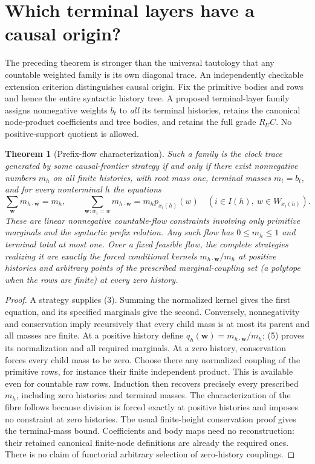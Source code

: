 \documentclass[11pt]{article}
\newtheorem{theorem}{Theorem}\newtheorem{proposition}[theorem]{Proposition}
\begin{document}
\section{Which terminal layers have a causal origin?}
The preceding theorem is stronger than the universal tautology that any countable weighted family is its own diagonal trace. An independently checkable extension criterion distinguishes causal origin. Fix the primitive bodies and rows and hence the entire syntactic history tree. A proposed terminal-layer family assigns nonnegative weights $b_t$ to \emph{all} its terminal histories, retains the canonical node-product coefficients and tree bodies, and retains the full grade $R_UC$. No positive-support quotient is allowed.

\begin{theorem}[Prefix-flow characterization]
Such a family is the clock trace generated by some causal-frontier strategy if and only if there exist nonnegative numbers $m_h$ on all finite histories, with root mass one, terminal masses $m_t=b_t$, and for every nonterminal $h$ the equations
\[
 \sum_{\mathbf w}m_{h\cdot\mathbf w}=m_h,\qquad
 \sum_{\mathbf w:w_i=w}m_{h\cdot\mathbf w}=m_h p_{x_i(h)}(w)
 \quad(i\in I(h),\ w\in W_{x_i(h)}).                     \tag{5}
\]
These are linear nonnegative countable-flow constraints involving only primitive marginals and the syntactic prefix relation. Any such flow has $0\leq m_h\leq1$ and terminal total at most one. Over a fixed feasible flow, the complete strategies realizing it are exactly the forced conditional kernels $m_{h\cdot\mathbf w}/m_h$ at positive histories and arbitrary points of the prescribed marginal-coupling set (a polytope when the rows are finite) at every zero history.
\end{theorem}
\begin{proof}
A strategy supplies (3). Summing the normalized kernel gives the first equation, and its specified marginals give the second. Conversely, nonnegativity and conservation imply recursively that every child mass is at most its parent and all masses are finite. At a positive history define $q_h(\mathbf w)=m_{h\cdot\mathbf w}/m_h$; (5) proves its normalization and all required marginals. At a zero history, conservation forces every child mass to be zero. Choose there any normalized coupling of the primitive rows, for instance their finite independent product. This is available even for countable raw rows. Induction then recovers precisely every prescribed $m_h$, including zero histories and terminal masses. The characterization of the fibre follows because division is forced exactly at positive histories and imposes no constraint at zero histories. The usual finite-height conservation proof gives the terminal-mass bound. Coefficients and body maps need no reconstruction: their retained canonical finite-node definitions are already the required ones. There is no claim of functorial arbitrary selection of zero-history couplings.
\end{proof}
\end{document}
